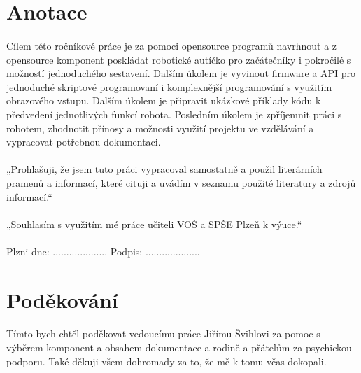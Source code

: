 \documentclass[12pt]{article}
\begin{document}
	\thispagestyle{empty}
	
	
	\begin{spacing}{1.5}
	
	\newpage
	\thispagestyle{empty}
	\section*{Anotace}
	\paragraph{} Cílem této ročníkové práce je za pomoci opensource programů navrhnout a z opensource komponent poskládat robotické autíčko pro začátečníky i pokročilé s možností jednoduchého sestavení. Dalším úkolem je vyvinout firmware a API pro jednoduché skriptové programovaní i komplexnější programování s využitím obrazového vstupu. Dalším úkolem je připravit ukázkové příklady kódu k předvedení jednotlivých funkcí robota. Posledním úkolem je zpříjemnit práci s robotem, zhodnotit přínosy a možnosti využití projektu ve vzdělávání a vypracovat potřebnou dokumentaci.
	\vfill
	\paragraph{} „Prohlašuji, že jsem tuto práci vypracoval samostatně a použil literárních pramenů a informací, které cituji a uvádím v seznamu použité literatury a zdrojů informací.“
	\paragraph{} „Souhlasím s využitím mé práce učiteli VOŠ a SPŠE Plzeň k výuce.“
	\paragraph{} \hfill Plzni dne: .................... Podpis: ....................
	
	\newpage
	\thispagestyle{empty}
	\section*{Poděkování}
	\paragraph{} Tímto bych chtěl poděkovat vedoucímu práce Jiřímu Švihlovi za pomoc s výběrem komponent a obsahem dokumentace a rodině a přátelům za psychickou podporu. Také děkuji všem dohromady za to, že mě k tomu včas dokopali.
	

\end{spacing}
\end{document}
